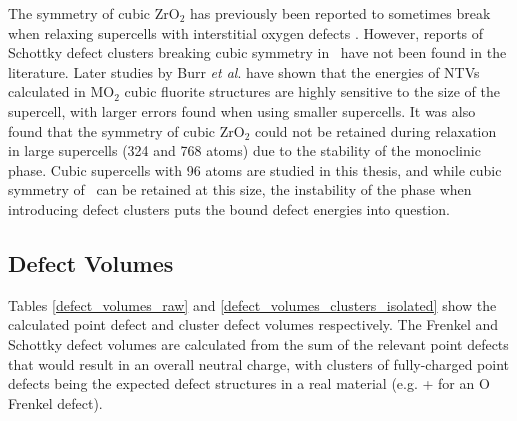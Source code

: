 The symmetry of cubic ZrO$_{2}$ has previously been reported to sometimes break when relaxing supercells with interstitial oxygen defects \cite{samanta2010thermodynamic}. However, reports of Schottky defect clusters breaking cubic symmetry in \zirconia\ have not been found in the literature. Later studies by Burr \emph{et al}. \cite{burr2017importance} have shown that the energies of NTVs calculated in MO$_{2}$ cubic fluorite structures are highly sensitive to the size of the supercell, with larger errors found when using smaller supercells. It was also found that the symmetry of cubic ZrO$_{2}$ could not be retained during relaxation in large supercells (324 and 768 atoms) due to the stability of the monoclinic phase. Cubic supercells with 96 atoms are studied in this thesis, and while cubic symmetry of \zirconia\ can be retained at this size, the instability of the phase when introducing defect clusters puts the bound defect energies into question.


\subsection{Defect Volumes} \label{defect_volumes_r1}

Tables \ref{defect_volumes_raw} and \ref{defect_volumes_clusters_isolated} show the calculated point defect and cluster defect volumes respectively. The Frenkel and Schottky defect volumes are calculated from the sum of the relevant point defects that would result in an overall neutral charge, with clusters of fully-charged point defects being the expected defect structures in a real material (e.g.  +  for an O Frenkel defect).


